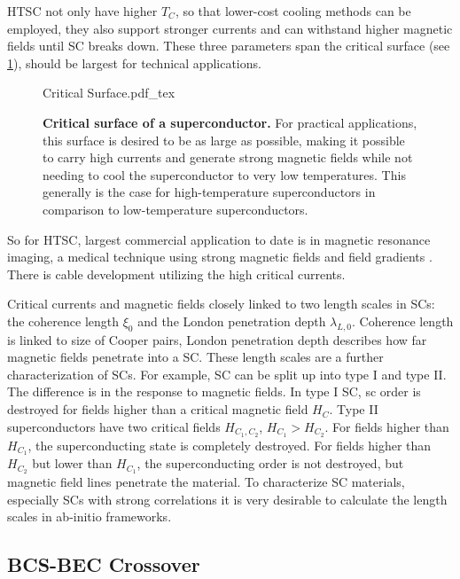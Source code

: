 \documentclass[../notes.tex]{subfiles}
\begin{document}
HTSC not only have higher \(T_C\), so that lower-cost cooling methods can be employed, they also support stronger currents and can withstand higher magnetic fields until SC breaks down.
These three parameters span the critical surface (see \cref{fig:Critical Surface of a SC}), should be largest for technical applications.
\begin{figure}
	\centering
	{Critical Surface.pdf_tex}
	\caption{\textbf{Critical surface of a superconductor.} For practical applications, this surface is desired to be as large as possible, making it possible to carry high currents and generate strong magnetic fields while not needing to cool the superconductor to very low temperatures. This generally is the case for high-temperature superconductors in comparison to low-temperature superconductors. }
	\label{fig:Critical Surface of a SC}
\end{figure}
So for HTSC, largest commercial application to date is in magnetic resonance imaging, a medical technique using strong magnetic fields and field gradients \cite{rinckMagneticResonanceMedicine}.
There is cable development \cite{schmidtOperationExperienceFurther2012, konstantopoulouDesignOptimizationEvaluation2019} utilizing the high critical currents.

Critical currents and magnetic fields closely linked to two length scales in SCs: the coherence length \(\xi_0\) and the London penetration depth \(\lambda_{L,0}\).
Coherence length is linked to size of Cooper pairs, London penetration depth describes how far magnetic fields penetrate into a SC.
These length scales are a further characterization of SCs.
For example, SC can be split up into type I and type II.
The difference is in the response to magnetic fields.
In type I SC, sc order is destroyed for fields higher than a critical magnetic field \(H_{C}\).
Type II superconductors have two critical fields \(H_{C_1, C_2}\), \(H_{C_1} > H_{C_2}\).
For fields higher than \(H_{C_1}\), the superconducting state is completely destroyed.
For fields higher than \(H_{C_2}\) but lower than \(H_{C_1}\), the superconducting order is not destroyed, but magnetic field lines penetrate the material.
To characterize SC materials, especially SCs with strong correlations it is very desirable to calculate the length scales in ab-initio frameworks.

\subsection*{BCS-BEC Crossover}
\end{document}
